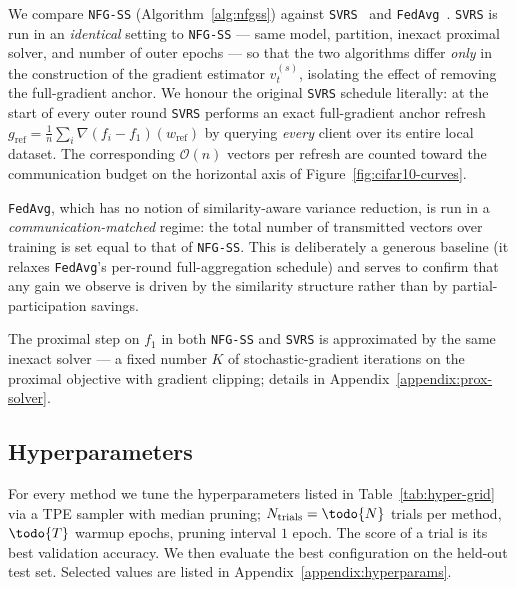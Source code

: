 We compare \texttt{NFG-SS} (Algorithm~\ref{alg:nfgss}) against
\texttt{SVRS}~\citep{} and \texttt{FedAvg}~\citep{}.
\texttt{SVRS} is run in an \emph{identical} setting to \texttt{NFG-SS}
— same model, partition, inexact proximal solver, and number of outer
epochs — so that the two algorithms differ \emph{only} in the
construction of the gradient estimator $v_t^{(s)}$, isolating the
effect of removing the full-gradient anchor. We honour the original
\texttt{SVRS} schedule literally: at the start of every outer round
\texttt{SVRS} performs an exact full-gradient anchor refresh
$g_{\mathrm{ref}}=\tfrac{1}{n}\sum_i\nabla(f_i-f_1)(w_{\mathrm{ref}})$
by querying \emph{every} client over its entire local dataset. The
corresponding $\mathcal{O}(n)$ vectors per refresh are counted toward
the communication budget on the horizontal axis of
Figure~\ref{fig:cifar10-curves}.

\texttt{FedAvg}, which has no notion of similarity-aware variance
reduction, is run in a \emph{communication-matched} regime: the total
number of transmitted vectors over training is set equal to that of
\texttt{NFG-SS}. This is deliberately a generous baseline (it relaxes
\texttt{FedAvg}'s per-round full-aggregation schedule) and serves to
confirm that any gain we observe is driven by the similarity structure
rather than by partial-participation savings.

The proximal step on $f_1$ in both \texttt{NFG-SS} and \texttt{SVRS}
is approximated by the same inexact solver — a fixed number $K$ of
stochastic-gradient iterations on the proximal objective with gradient
clipping; details in Appendix~\ref{appendix:prox-solver}.

\subsection{Hyperparameters}
\label{sec:exp-hyper}

For every method we tune the hyperparameters listed in
Table~\ref{tab:hyper-grid} via a TPE sampler with median pruning;
$N_{\mathrm{trials}}=\todo{N}$ trials per method, $\todo{T}$ warmup
epochs, pruning interval $1$ epoch. The score of a trial is its best
validation accuracy. We then evaluate the best configuration on the
held-out test set. Selected values are listed in
Appendix~\ref{appendix:hyperparams}.

